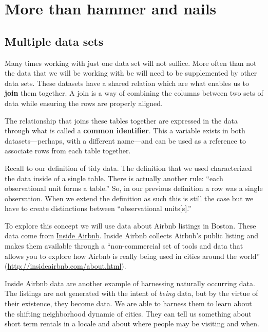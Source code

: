 \documentclass[
]{book}
\begin{document}
\hypertarget{part-more-than-hammer-and-nails}{%
\part{More than hammer and nails}\label{part-more-than-hammer-and-nails}}

\hypertarget{multiple-data-sets}{%
\chapter{Multiple data sets}\label{multiple-data-sets}}

Many times working with just one data set will not suffice. More often than not the data that we will be working with be will need to be supplemented by other data sets. These datasets have a shared relation which are what enables us to \textbf{join} them together. A join is a way of combining the columns between two sets of data while ensuring the rows are properly aligned.

The relationship that joins these tables together are expressed in the data through what is called a \textbf{common identifier}. This a variable exists in both datasets---perhaps, with a different name---and can be used as a reference to associate rows from each table together.

Recall to our definition of tidy data. The definition that we used characterized the data inside of a single table. There is actually another rule: ``each observational unit forms a table.'' So, in our previous definition a row was a single observation. When we extend the definition as such this is still the case but we have to create distinctions between ``observational units{[}s{]}.''

To explore this concept we will use data about Airbnb listings in Boston. These data come from \href{http://insideairbnb.com}{Inside Airbnb}. Inside Airbnb collects Airbnb's public listing and makes them available through a ``non-commercial set of tools and data that allows you to explore how Airbnb is really being used in cities around the world'' (\url{http://insideairbnb.com/about.html}).

Inside Airbnb data are another example of harnessing naturally occurring data. The listings are not generated with the intent of \emph{being} data, but by the virtue of their existence, they become data. We are able to harness them to learn about the shifting neighborhood dynamic of cities. They can tell us something about short term rentals in a locale and about where people may be visiting and when.
\end{document}
